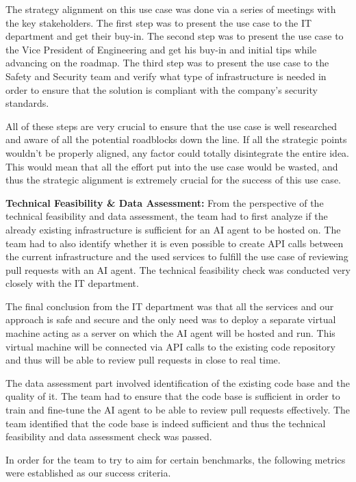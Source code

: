 \documentclass[]{imc-inf}
\begin{document}
The strategy alignment on this use case was done via a series of meetings with the key stakeholders. The first step was to present the use case to the IT department and get their buy-in. The second step was to present the use case to the Vice President of Engineering and get his buy-in and initial tips while advancing on the roadmap. The third step was to present the use case to the Safety and Security team and verify what type of infrastructure is needed in order to ensure that the solution is compliant with the company's security standards.

All of these steps are very crucial to ensure that the use case is well researched and aware of all the potential roadblocks down the line. If all the strategic points wouldn't be properly aligned, any factor could totally disintegrate the entire idea. This would mean that all the effort put into the use case would be wasted, and thus the strategic alignment is extremely crucial for the success of this use case.

\textbf{Technical Feasibility \& Data Assessment:}
From the perspective of the technical feasibility and data assessment, the team had to first analyze if the already existing infrastructure is sufficient for an AI agent to be hosted on. The team had to also identify whether it is even possible to create API calls between the current infrastructure and the used services to fulfill the use case of reviewing pull requests with an AI agent.
The technical feasibility check was conducted very closely with the IT department. 

The final conclusion from the IT department was that all the services and our approach is safe and secure and the only need was to deploy a separate virtual machine acting as a server on which the AI agent will be hosted and run. This virtual machine will be connected via API calls to the existing code repository and thus will be able to review pull requests in close to real time.

The data assessment part involved identification of the existing code base and the quality of it. The team had to ensure that the code base is sufficient in order to train and fine-tune the AI agent to be able to review pull requests effectively. The team identified that the code base is indeed sufficient and thus the technical feasibility and data assessment check was passed.

In order for the team to try to aim for certain benchmarks, the following metrics were established as our success criteria. 
\end{document}
